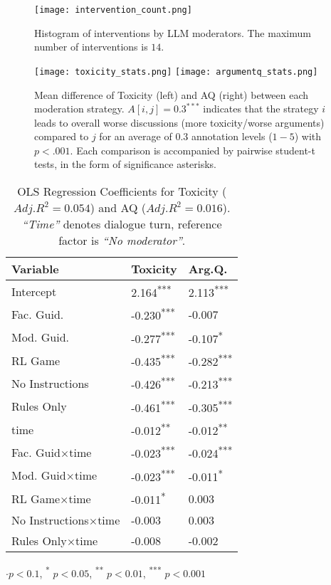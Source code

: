\begin{figure}[t]
	\centering
	\texttt{[image: intervention\_count.png]}
	\caption{Histogram of interventions by \ac{LLM} moderators. The maximum number of interventions is $14$.}
	\label{fig:intervention_count}
\end{figure}

\begin{figure*}[t]
    \texttt{[image: toxicity\_stats.png]} \hfill
    \texttt{[image: argumentq\_stats.png]}
	\centering
	\caption{Mean difference of Toxicity (left) and \ac{AQ} (right) between each moderation strategy. $A[i, j] = 0.3^{***}$ indicates that the strategy $i$ leads to overall worse discussions (more toxicity/worse arguments) compared to $j$ for an average of $0.3$ annotation levels ($1-5$) with $p<.001$. Each comparison is accompanied by pairwise student-t tests, in the form of significance asterisks.}
	\label{fig:toxicity_aq_stats}
\end{figure*}

\begin{table}[t]
\centering
    \begin{tabular}{lll}
        \toprule
        \textbf{Variable} & \textbf{Toxicity} & \textbf{Arg.Q.} \\
        \midrule
        Intercept & 2.164\textsuperscript{***} & 2.113\textsuperscript{***} \\
        Fac. Guid. & -0.230\textsuperscript{***} & -0.007 \\
        Mod. Guid. & -0.277\textsuperscript{***} & -0.107\textsuperscript{*} \\
        \ac{RL} Game & -0.435\textsuperscript{***} & -0.282\textsuperscript{***} \\
        No Instructions & -0.426\textsuperscript{***} & -0.213\textsuperscript{***} \\
        Rules Only & -0.461\textsuperscript{***} & -0.305\textsuperscript{***} \\
        time & -0.012\textsuperscript{**} & -0.012\textsuperscript{**} \\
        Fac. Guid$\times$time & -0.023\textsuperscript{***} & -0.024\textsuperscript{***} \\
        Mod. Guid$\times$time & -0.023\textsuperscript{***} & -0.011\textsuperscript{*} \\
        \ac{RL} Game$\times$time & -0.011\textsuperscript{*} & 0.003 \\
        No Instructions$\times$time & -0.003 & 0.003 \\
        Rules Only$\times$time & -0.008 & -0.002 \\
        \bottomrule
    \end{tabular}
    \small
    $\cdot p<0.1$, \textsuperscript{*} $p<0.05$, \textsuperscript{**} $p<0.01$, \textsuperscript{***} $p<0.001$
    \normalsize
    \caption{OLS Regression Coefficients for Toxicity ($Adj. R^2=0.054$) and \ac{AQ} ($Adj. R^2=0.016$). \textit{“Time”} denotes dialogue turn, reference factor is \textit{“No moderator”}.}
    \label{tab:timeseries}
\end{table}



